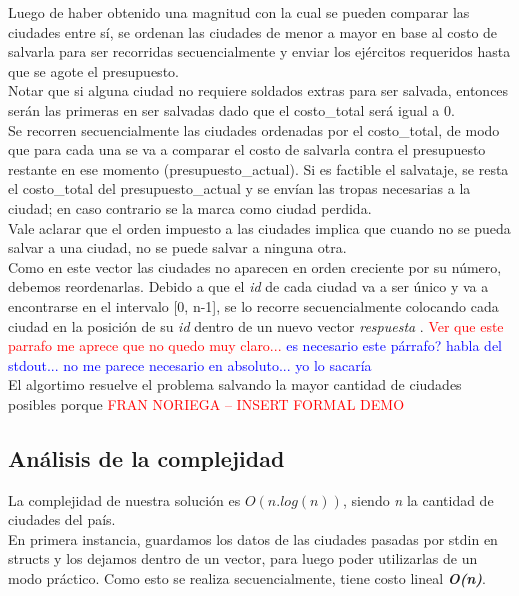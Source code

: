 \documentclass[a4paper]{article}
\begin{document}
Luego de haber obtenido una magnitud con la cual se pueden comparar las ciudades entre s\'i, se ordenan las ciudades de menor a mayor en base al costo de salvarla para ser recorridas secuencialmente y enviar los ej\'ercitos requeridos hasta que se agote el presupuesto.\\

Notar que si alguna ciudad no requiere soldados extras para ser salvada, entonces ser\'an las primeras en ser salvadas dado que el costo_total ser\'a igual a 0.\\
 
Se recorren secuencialmente las ciudades ordenadas por el costo_total, de modo que para cada una se va a comparar el costo de salvarla contra el presupuesto restante en ese momento (presupuesto_actual). Si es factible el salvataje, se resta el costo_total del presupuesto_actual y se env\'ian las tropas necesarias a la ciudad; en caso contrario se la marca como ciudad perdida.\\

Vale aclarar que el orden impuesto a las ciudades implica que cuando no se pueda salvar a una ciudad, no se puede salvar a ninguna otra.\\
 
Como en este vector las ciudades no aparecen en orden creciente por su n\'umero, debemos reordenarlas. Debido a que el \emph{id} de cada ciudad va a ser \'unico y va a encontrarse en el intervalo [0, n-1], se lo recorre secuencialmente colocando cada ciudad en la posici\'on de su \textit{id} dentro de un nuevo vector \emph{respuesta} . \textcolor{red}{Ver que este parrafo me aprece que no quedo muy claro...} \textcolor{blue}{es necesario este p\'arrafo? habla del stdout... no me parece necesario en absoluto... yo lo sacar\'ia}\\

El algortimo resuelve el problema salvando la mayor cantidad de ciudades posibles porque
\textcolor{red}{FRAN NORIEGA -- INSERT FORMAL DEMO}

\newpage
\subsection{An\'alisis de la complejidad}
La complejidad de nuestra soluci\'on es $O(n.log(n))$, siendo \emph{n} la cantidad de ciudades del pa\'is.\\

En primera instancia, guardamos los datos de las ciudades pasadas por stdin en structs y los dejamos dentro de un vector, para luego poder utilizarlas de un modo pr\'actico. Como esto se realiza secuencialmente, tiene costo lineal \textbf{\textit{O(n)}}.
\end{document}
